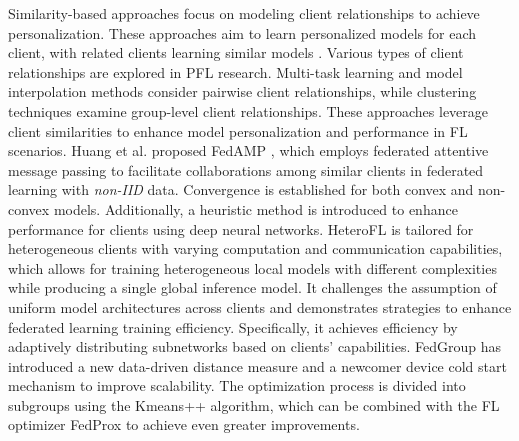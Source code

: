 \documentclass[sigconf]{acmart}
\begin{document}
\par
Similarity-based approaches focus on modeling client relationships to achieve personalization. These approaches aim to learn personalized models for each client, with related clients learning similar models \cite{ouyang2021clusterfl}. Various types of client relationships are explored in PFL research. Multi-task learning \cite{hu2021private} and model interpolation methods \cite{chen2023fedsoup} consider pairwise client relationships, while clustering techniques \cite{briggs2020federated} examine group-level client relationships. These approaches leverage client similarities to enhance model personalization and performance in FL scenarios.  Huang et al. proposed FedAMP \cite{huang2021personalized}, which employs federated attentive message passing to facilitate collaborations among similar clients in federated learning with \textit{non-IID} data. Convergence is established for both convex and non-convex models. Additionally, a heuristic method is introduced to enhance performance for clients using deep neural networks. HeteroFL \cite{diao2020heterofl} is tailored for heterogeneous clients with varying computation and communication capabilities, which allows for training heterogeneous local models with different complexities while producing a single global inference model. It challenges the assumption of uniform model architectures across clients and demonstrates strategies to enhance federated learning training efficiency. Specifically, it achieves efficiency by adaptively distributing subnetworks based on clients' capabilities. FedGroup \cite{duan2020fedgroup} has introduced a new data-driven distance measure and a newcomer device cold start mechanism to improve scalability. The optimization process is divided into subgroups using the Kmeans++ algorithm, which can be combined with the FL optimizer FedProx to achieve even greater improvements. 
\end{document}
